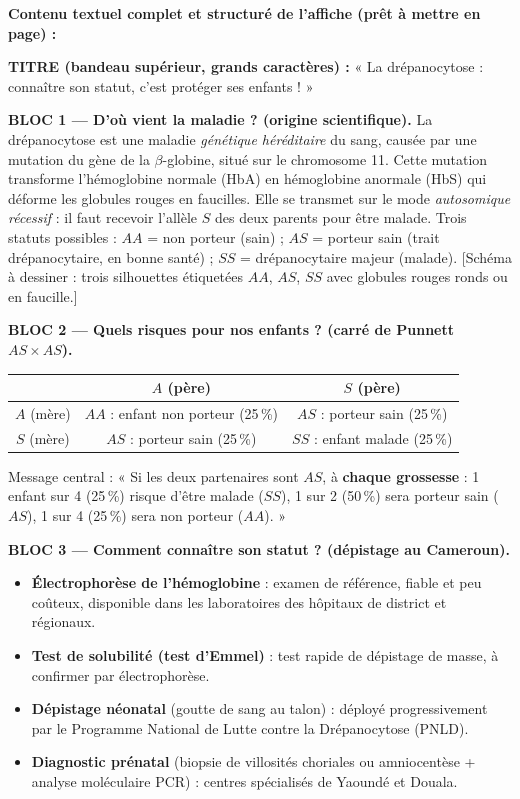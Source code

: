 \documentclass[11pt]{article}
\begin{document}
\begin{corrige}
\textbf{Contenu textuel complet et structuré de l'affiche (prêt à mettre en page) :}

\textbf{TITRE (bandeau supérieur, grands caractères) :} « La drépanocytose : connaître son statut, c'est protéger ses enfants ! »

\textbf{BLOC 1 — D'où vient la maladie ? (origine scientifique).} La drépanocytose est une maladie \emph{génétique héréditaire} du sang, causée par une mutation du gène de la $\beta$-globine, situé sur le chromosome 11. Cette mutation transforme l'hémoglobine normale (HbA) en hémoglobine anormale (HbS) qui déforme les globules rouges en faucilles. Elle se transmet sur le mode \emph{autosomique récessif} : il faut recevoir l'allèle $S$ des deux parents pour être malade. Trois statuts possibles : $AA$ = non porteur (sain) ; $AS$ = porteur sain (trait drépanocytaire, en bonne santé) ; $SS$ = drépanocytaire majeur (malade). [Schéma à dessiner : trois silhouettes étiquetées $AA$, $AS$, $SS$ avec globules rouges ronds ou en faucille.]

\textbf{BLOC 2 — Quels risques pour nos enfants ? (carré de Punnett $AS \times AS$).}
\begin{center}
\begin{tabular}{|c|c|c|}\hline
\rowcolor{popblueL} & $A$ (père) & $S$ (père) \\ \hline
$A$ (mère) & $AA$ : enfant non porteur (25\,\%) & $AS$ : porteur sain (25\,\%) \\ \hline
$S$ (mère) & $AS$ : porteur sain (25\,\%) & $SS$ : enfant malade (25\,\%) \\ \hline
\end{tabular}
\end{center}
Message central : « Si les deux partenaires sont $AS$, à \textbf{chaque grossesse} : 1 enfant sur 4 (25\,\%) risque d'être malade ($SS$), 1 sur 2 (50\,\%) sera porteur sain ($AS$), 1 sur 4 (25\,\%) sera non porteur ($AA$). »

\textbf{BLOC 3 — Comment connaître son statut ? (dépistage au Cameroun).}
\begin{itemize}
    \item \textbf{Électrophorèse de l'hémoglobine} : examen de référence, fiable et peu coûteux, disponible dans les laboratoires des hôpitaux de district et régionaux.
    \item \textbf{Test de solubilité (test d'Emmel)} : test rapide de dépistage de masse, à confirmer par électrophorèse.
    \item \textbf{Dépistage néonatal} (goutte de sang au talon) : déployé progressivement par le Programme National de Lutte contre la Drépanocytose (PNLD).
    \item \textbf{Diagnostic prénatal} (biopsie de villosités choriales ou amniocentèse + analyse moléculaire PCR) : centres spécialisés de Yaoundé et Douala.
\end{itemize}


\end{corrige}
\end{document}
